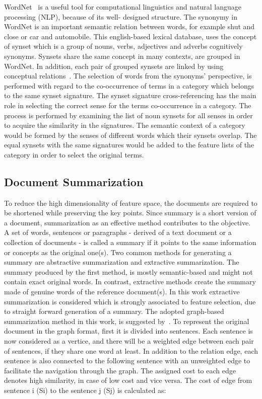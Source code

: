 \documentclass{sigchi}
\begin{document}
WordNet~\cite{miller1990introduction} is a useful tool for computational linguistics and natural language processing (NLP), because of its well-
designed structure. 
The synonymy in WordNet is an important semantic relation between words, for example shut and close or car and automobile. 
This english-based lexical database, uses the concept of synset which is a group of nouns, verbs, adjectives and adverbs cognitively synonyms.
Synsets share the same concept in many contexts, are grouped in WordNet.
In addition, each pair of grouped synsets are linked by using conceptual relations~\cite{1410799}. 
The selection of words from the synonyms’ perspective, is performed with regard to the co-occurrence of terms in a category which belongs to the same synset signature. 
The synset signature cross-referencing has the main role in selecting the correct sense for the terms co-occurrence in a category. The process is performed by examining the list of noun synsets for all senses in order to acquire the similarity in the signatures. 
The semantic context of a category would be formed by the senses of different words which their synsets overlap.
The equal synsets with the same signatures would be added to the feature lists of the category in order to select the original terms.

\subsection{Document Summarization}\label{sectionSummarization}
To reduce the high dimensionality of feature space, the documents are required to be shortened while preserving the key points. 
Since summary is a short version of a document, summarization as an effective method contributes to the objective.
A set of words, sentences or paragraphs - derived of a text document or a collection of documents - is called a summary if it points to the same information or concepts as the original one(s). 
Two common methods for generating a summary are abstractive summarization and extractive summarization. 
The summary produced by the first method, is mostly semantic-based and might not contain exact original words. 
In contrast, extractive methods create the summary made of genuine words of the reference document(s). 
In this work extractive summarization is considered which is strongly associated to feature selection, due to straight forward generation of a
summary.
The adopted graph-based summarization method in this work, is suggested by~\cite{sjobergh2006extraction}. 
To represent the original document in the graph format, first it is divided into sentences. 
Each sentence is now considered as a vertice, and there will be a weighted edge between each pair of sentences, if they share one word at least.
In addition to the relation edge, each sentence is also connected to the following sentence with an unweighted edge to facilitate the navigation through the graph.
The assigned cost to each edge denotes high similarity, in case of low cost and vice versa. 
The cost of edge from sentence i (Si) to the sentence j (Sj) is calculated as:
\end{document}
